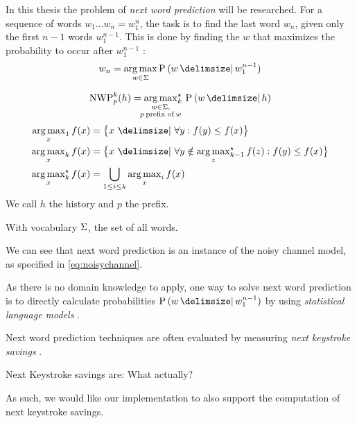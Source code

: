 In this thesis the problem of \emph{next word prediction} will be researched.
For a sequence of words $w_1 \ldots w_n = w_1^{n}$, the task is to find the last word
$w_n$, given only the first $n-1$ words $w_1^{n-1}$.
This is done by finding the $w$ that maximizes the probability to
occur after $w_1^{n-1}$ \parencite{Bickel2005}:
\begin{equation}
  \label{eq:nwp}
  w_n = \Argmax{w \in \Vocab} \Prob{w}{w_1^{n-1}}
\end{equation}
\begin{draft}
\begin{equation}
  \label{eq:prefixquery}
  \NWP[p][k]{h} =
    \Argmax*[k]{\mathclap{\substack{w \in \Vocab,\\p \: \text{prefix of} \: w}}}
      \Prob{w}{h}
\end{equation}
\begin{subequations}
  \begin{align}
    \Argmax [1]{x} f(x) &= \big\{ x \,\Given\, \forall y : f(y) \leq f(x) \big\} \\
    \Argmax [k]{x} f(x) &= \big\{ x \,\Given\, \forall y \notin \Argmax*[k-1]{z} f(z) : f(y) \leq f(x) \big\} \\
    \Argmax*[k]{x} f(x) &= \bigcup_{{1 \leq i \leq k}} \Argmax[i]{x} f(x)
  \end{align}
\end{subequations}
We call $h$ the history and $p$ the prefix.
\end{draft}
With vocabulary $\Sigma$, the set of all words.

We can see that next word prediction is an instance of the noisy channel model,
as specified in \cref{eq:noisychannel}.

As there is no domain knowledge to apply, one way to solve next word prediction
is to directly calculate probabilities $\Prob{w}{w_1^{n-1}}$ by using
\emph{statistical language models} \parencite{Bickel2005}.

Next word prediction techniques are often evaluated by measuring \emph{next
keystroke savings} \parencite{Bickel2005}.
\begin{draft}Next Keystroke savings are: What actually?\end{draft}
As such, we would like our implementation to also support the computation of
next keystroke savings.

